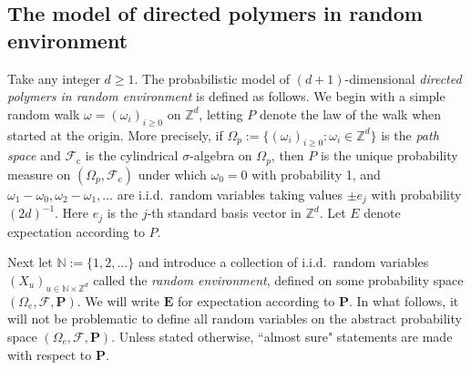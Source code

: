 \documentclass[11pt,reqno]{amsart}
\numberwithin{equation}{section}
\theoremstyle{definition}
\begin{document}
\subsection{The model of directed polymers in random environment} \label{model}
Take any integer $d\ge 1$. The probabilistic model of $(d+1)$-dimensional \textit{directed polymers in random environment} is defined as follows. We begin with a simple random walk $\omega = (\omega_i)_{i \geq 0}$ on ${\mathbb{Z}}^d$, letting $P$ denote the law of the walk when started at the origin.
More precisely, if $\Omega_p := \{(\omega_i)_{i \geq 0} : \omega_i \in {\mathbb{Z}}^d\}$ is the \textit{path space} and ${\mathcal{F}}_{\text{c}}$ is the cylindrical $\sigma$-algebra on $\Omega_p$, then $P$ is the unique probability measure on $(\Omega_p,{\mathcal{F}}_\text{c})$ under which $\omega_0 = 0$ with probability 1, and $\omega_1 - \omega_0, \omega_2 - \omega_1, \dots$ are i.i.d.~random variables taking values $\pm e_j$ with probability $(2d)^{-1}$.
Here $e_j$ is the $j$-th standard basis vector in ${\mathbb{Z}}^d$.
Let $E$ denote expectation according to $P$. 

Next let ${\mathbb{N}} := \{1,2,\dots\}$ and introduce a collection of i.i.d.~random variables $(X_u)_{u \in {\mathbb{N}} \times {\mathbb{Z}}^d}$ called the \textit{random environment}, defined on some probability space $(\Omega_e,{\mathcal{F}},{\mathbf{P}})$.
We will write ${\mathbf{E}}$ for expectation according to ${\mathbf{P}}$. In what follows, it will not be problematic to define all random variables on the abstract probability space $(\Omega_e,{\mathcal{F}},{\mathbf{P}})$.
Unless stated otherwise, ``almost sure" statements are made with respect to ${\mathbf{P}}$. 
\end{document}
